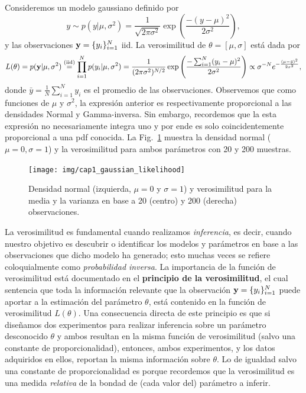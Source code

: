 \begin{mdframed}[style=ejemplo, frametitle={\center Ejemplo: Verosimilitud para el modelo gaussiano  (muestras  independientes)}]

Consideremos un  modelo gaussiano definido por 
\begin{equation}
	y \sim p(y|\mu,\sigma^2) = \frac{1}{\sqrt{2\pi\sigma^2}}\exp\left(\frac{-(y-\mu)^2}{2\sigma^2}\right),
\end{equation}
y las observaciones $\mathbf{y} = \{y_i\}_{i=1}^N$ iid. La verosimilitud  de $\theta  =  [\mu,\sigma]$ está dada por 
\begin{equation}
  	L(\theta)  =  p(\mathbf{y}|\mu,\sigma^2) 
  				\stackrel{\text{(iid)}}{=}\prod_{i=1}^N p(y_i|\mu,\sigma^2) 
  				= \frac{1}{(2\pi\sigma^2)^{N/2}}  \exp\left(\frac{-\sum_{i=1}^N(y_i-\mu)^2}{2\sigma^2}\right)
  				\propto \sigma^{-N} e^{-\frac{(\mu-\bar y)^2}{2\sigma^2}},
  \end{equation}  
  donde $\bar y = \tfrac{1}{N}\sum_{i=1}^Ny_i$ es el promedio de las observaciones. Observemos que como funciones de $\mu$ y $\sigma^2$, la expresión anterior es respectivamente  proporcional a las densidades Normal y Gamma-inversa. Sin embargo, recordemos que la esta  expresión no necesariamente integra uno y por  ende es solo coincidentemente proporcional a una pdf conocida. La Fig.~\ref{fig:gaussian_likelihood} muestra la  densidad normal ($\mu=0,\sigma=1$) y la verosimilitud para ambos parámetros con 20 y 200 muestras. 

\begin{figure}[H]
	\centering
	\texttt{[image: img/cap1\_gaussian\_likelihood]}\\
	\caption{Densidad normal (izquierda, $\mu=0$ y $\sigma=1$) y verosimilitud para la media y la varianza en base a 20 (centro) y 200 (derecha) observaciones.}
	\label{fig:gaussian_likelihood}  
\end{figure}
  


\end{mdframed}

La verosimilitud es fundamental cuando realizamos \emph{inferencia}, es decir, cuando nuestro objetivo es descubrir o identificar los modelos y parámetros en base a las observaciones que dicho modelo ha generado; esto muchas veces se refiere coloquialmente como \emph{probabilidad inversa}. La importancia de la función de verosimilitud está documentado en el \textbf{principio de la verosimilitud}, el cual sentencia que toda la información relevante que la observación $\mathbf{y} = \{y_i\}_{i=1}^N$ puede aportar a la estimación del parámetro $\theta$, está contenido en la función  de verosimilitud $L(\theta)$. Una consecuencia directa de este principio es que si diseñamos dos experimentos para realizar  inferencia  sobre un parámetro desconocido $\theta$ y ambos  resultan en la misma función de verosimilitud  (salvo una constante de proporcionalidad), entonces,  ambos experimentos, y los datos adquiridos en  ellos, reportan la misma  información  sobre $\theta$. Lo de igualdad salvo una constante de proporcionalidad es porque recordemos que la verosimilitud es una medida \emph{relativa} de la bondad de (cada valor del) parámetro a inferir. 

